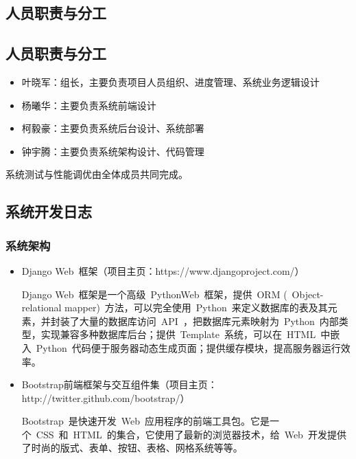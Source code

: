 \appendix
\begin{center}
  \section{人员职责与分工}
\end{center}

\subsection{人员职责与分工}
\begin{itemize}
  \item 叶晓军：组长，主要负责项目人员组织、进度管理、系统业务逻辑设计
  \item 杨曦华：主要负责系统前端设计
  \item 柯毅豪：主要负责系统后台设计、系统部署
  \item 钟宇腾：主要负责系统架构设计、代码管理
\end{itemize}
系统测试与性能调优由全体成员共同完成。

\subsection{系统开发日志}
\subsubsection{系统架构}
\begin{itemize}
  \item Django Web~框架（项目主页：https://www.djangoproject.com/）
  
  \CJKindent Django Web~框架是一个高级~Python\footnotemark[1] Web~框架，提供~ORM (~Object-relational mapper)~方法，可以完全使用~Python~来定义数据库的表及其元素，并封装了大量的数据库访问~API~，把数据库元素映射为~Python~内部类型，实现兼容多种数据库后台；提供~Template~系统，可以在~HTML~中嵌入~Python~代码便于服务器动态生成页面；提供缓存模块，提高服务器运行效率。
  
  \item Bootstrap前端框架与交互组件集（项目主页：http://twitter.github.com/bootstrap/）
  
  \CJKindent Bootstrap~是快速开发~Web~应用程序的前端工具包。它是一个~CSS~和~HTML~的集合，它使用了最新的浏览器技术，给~Web~开发提供了时尚的版式、表单、按钮、表格、网格系统等等。
\end{itemize}


